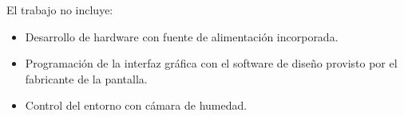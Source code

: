El trabajo no incluye:

\begin{itemize}
\item Desarrollo de hardware con fuente de alimentación incorporada.
\item Programación de la interfaz gráfica con el software de diseño provisto por
el fabricante de la pantalla.
\item Control del entorno con cámara de humedad.
\end{itemize}


